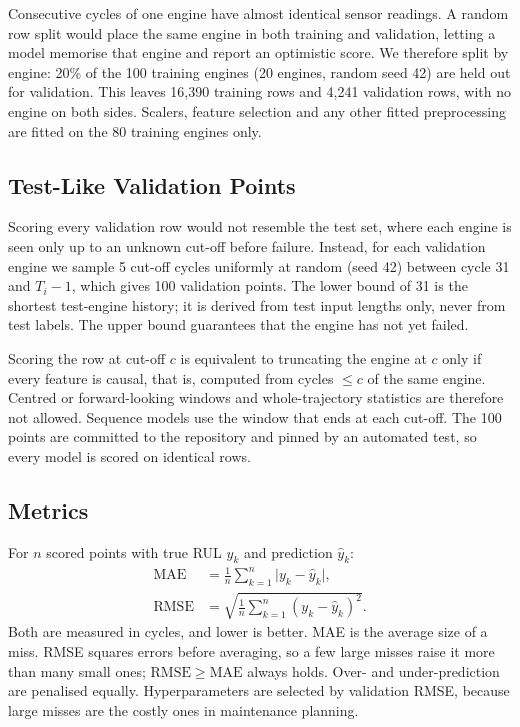 Consecutive cycles of one engine have almost identical sensor readings. A
random row split would place the same engine in both training and validation,
letting a model memorise that engine and report an optimistic score. We
therefore split by engine: 20\% of the 100 training engines (20 engines,
random seed 42) are held out for validation. This leaves 16{,}390 training
rows and 4{,}241 validation rows, with no engine on both sides. Scalers,
feature selection and any other fitted preprocessing are fitted on the 80
training engines only.

\subsection{Test-Like Validation Points}

Scoring every validation row would not resemble the test set, where each
engine is seen only up to an unknown cut-off before failure. Instead, for each
validation engine we sample 5 cut-off cycles uniformly at random (seed 42)
between cycle 31 and $T_i - 1$, which gives 100 validation points. The lower
bound of 31 is the shortest test-engine history; it is derived from test
input lengths only, never from test labels. The upper bound guarantees that
the engine has not yet failed.

Scoring the row at cut-off $c$ is equivalent to truncating the engine at $c$
only if every feature is causal, that is, computed from cycles $\le c$ of the
same engine. Centred or forward-looking windows and whole-trajectory
statistics are therefore not allowed. Sequence models use the window that
ends at each cut-off. The 100 points are committed to the repository and
pinned by an automated test, so every model is scored on identical rows.

\subsection{Metrics}

For $n$ scored points with true RUL $y_k$ and prediction $\hat{y}_k$:
\begin{align}
  \mathrm{MAE}  &= \frac{1}{n}\sum_{k=1}^{n} \lvert y_k - \hat{y}_k \rvert , \\
  \mathrm{RMSE} &= \sqrt{\frac{1}{n}\sum_{k=1}^{n} \left(y_k - \hat{y}_k\right)^2 } .
\end{align}
Both are measured in cycles, and lower is better. MAE is the average size of
a miss. RMSE squares errors before averaging, so a few large misses raise it
more than many small ones; $\mathrm{RMSE} \ge \mathrm{MAE}$ always holds. Over-
and under-prediction are penalised equally. Hyperparameters are selected by
validation RMSE, because large misses are the costly ones in maintenance
planning.

